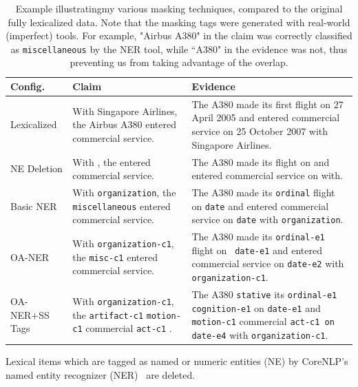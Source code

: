 \documentclass{article}
\begin{document}
\begin{table}[t]
\begin{center}
\begin{tabular}{p{20mm}|p{55mm}|p{70mm}}

\textbf{Config.} & \textbf{Claim}& \textbf{Evidence} \\ \hline
Lexicalized & {With Singapore Airlines, the Airbus A380 entered commercial service.} & {The A380 made its first flight on 27 April 2005 and entered commercial service on 25 October 2007 with Singapore Airlines.}\\
\hline 
NE Deletion & {With  , the  entered commercial service.} & {The A380 made its  flight on  and entered commercial service on  with.}\\
\hline 
Basic NER  & {With \texttt{organization}, the \texttt{miscellaneous} entered commercial service.} & {The A380 made its \texttt{ordinal} flight on \texttt{date} and entered commercial service on \texttt{date} with \texttt{organization}.}\\
\hline 
OA-NER  & {With \texttt{organization-c1}, the \texttt{misc-c1} entered commercial service.} & {The A380 made its \texttt{ordinal-e1} flight on \texttt{ date-e1} and entered commercial service on \texttt{date-e2} with \texttt{organization-c1}.}\\
\hline 

\mbox{OA-NER+SS} Tags & {With \texttt{organization-c1}, the \texttt{artifact-c1} \texttt{motion-c1} commercial \texttt{act-c1} .} & {The A380 \texttt{stative} its \texttt{ordinal-e1 cognition-e1} on \texttt{date-e1} and \texttt{motion-c1} commercial \texttt{act-c1 on date-e4} with \texttt{organization-c1}.  
}\\

\end{tabular}
\end{center}

    \caption{ Example illustratingmy various masking techniques, compared to the original fully lexicalized data. Note that the masking tags were generated with real-world (imperfect) tools. For example, "Airbus A380" in the claim was correctly classified as \texttt{miscellaneous} by the NER tool, while ``A380" in the evidence was not, thus preventing us from taking advantage of the overlap. }
    \label{masking_examples}
\end{table}

{}
Lexical items which are tagged as named or numeric entities (NE) by CoreNLP's named entity recognizer (NER)~\citep*{manning2014stanford} are deleted.  
\end{document}
